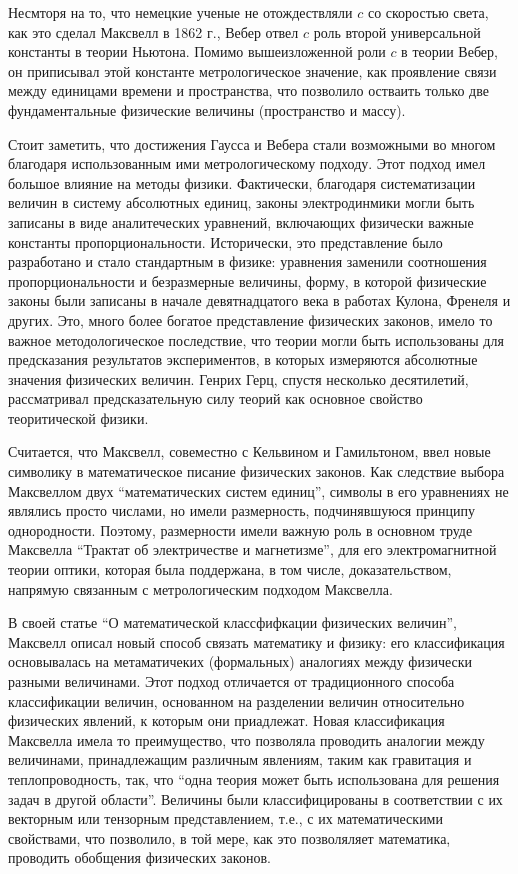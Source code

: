 \documentclass[12pt, oneside, a4paper]{article}
\begin{document}
Несмторя на то, что немецкие ученые не отождествляли $c$ со скоростью света, как это сделал Максвелл в 1862 г., Вебер отвел $c$ роль второй универсальной константы в теории Ньютона. Помимо вышеизложенной роли $c$ в теории Вебер, он приписывал этой константе метрологическое значение, как проявление связи между единицами времени и пространства, что позволило остваить только две фундаментальные физические величины (пространство и массу).

Стоит заметить, что достижения Гаусса и Вебера стали возможными во многом благодаря использованным ими метрологическому подходу. Этот подход имел большое влияние на методы физики. Фактически, благодаря систематизации величин в систему абсолютных единиц, законы электродинмики могли быть записаны в виде аналитеческих уравнений, включающих физически важные константы пропорциональности. Исторически, это представление было разработано и стало стандартным в физике: уравнения заменили соотношения пропорциональности и безразмерные величины, форму, в которой физические законы были записаны в начале девятнадцатого века в работах Кулона, Френеля и других. Это, много более богатое представление физических законов, имело то важное методологическое последствие, что теории могли быть использованы для предсказания результатов экспериментов, в которых измеряются абсолютные значения физических величин. Генрих Герц, спустя несколько десятилетий, рассматривал предсказательную силу теорий как основное свойство теоритической физики.

Считается, что Максвелл, совеместно с Кельвином и Гамильтоном, ввел новые символику в математическое писание физических законов. Как следствие выбора Максвеллом двух ``математических систем единиц'', символы в его уравнениях не являлись просто числами, но имели размерность, подчинявшуюся принципу однородности. Поэтому, размерности имели важную роль в основном труде Максвелла ``Трактат об электричестве и магнетизме'', для его электромагнитной теории оптики, которая была поддержана, в том числе, доказательством, напрямую связанным с метрологическим подходом Максвелла. 

В своей статье ``О математической классфифкации физических величин'', Максвелл описал новый способ связать математику и физику: его классификация основывалась на метаматичеких (формальных) аналогиях между физически разными величинами. Этот подход отличается от традиционного способа классификации величин, основанном на разделении величин относительно физических явлений, к которым они приадлежат. Новая классификация Максвелла имела то преимущество, что позволяла проводить аналогии между величинами, принадлежащим различным явлениям, таким как гравитация и теплопроводность, так, что ``одна теория может быть использована для решения задач в другой области''. Величины были классифицированы в соответствии с их векторным или тензорным представлением, т.е., с их математическими свойствами, что позволило, в той мере, как это позволяляет математика, проводить обобщения физических законов. 
\end{document}
